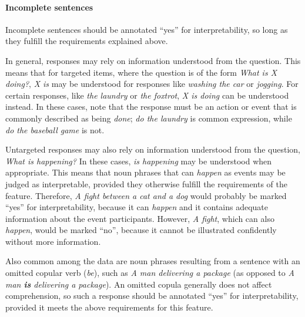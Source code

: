\documentclass[12pt,notitlepage]{article}
\begin{document}
\paragraph{Incomplete sentences} \label{para:interp-incomplete} Incomplete sentences should be annotated ``yes'' for interpretability, so long as they fulfill the requirements explained above.

In general, responses may rely on information understood from the question. This means that for targeted items, where the question is of the form \textit{What is X doing?}, \textit{X is} may be understood for responses like \textit{washing the car} or \textit{jogging}. For certain responses, like \textit{the laundry} or \textit{the foxtrot}, \textit{X is doing} can be understood instead. In these cases, note that the response must be an action or event that is commonly described as being \textit{done}; \textit{do the laundry} is common expression, while \textit{do the baseball game} is not. 

Untargeted responses may also rely on information understood from the question, \textit{What is happening?} In these cases, \textit{is happening} may be understood when appropriate. This means that noun phrases that can \textit{happen} as events may be judged as interpretable, provided they otherwise fulfill the requirements of the feature. Therefore, \textit{A fight between a cat and a dog} would probably be marked ``yes'' for interpretability, because it can \textit{happen} and it contains adequate information about the event participants. However, \textit{A fight}, which can also \textit{happen}, would be marked ``no'', because it cannot be illustrated confidently without more information.


Also common among the data are noun phrases resulting from a sentence with an omitted copular verb (\textit{be}), such as \textit{A man delivering a package} (as opposed to \textit{A man \textbf{is} delivering a package}). An omitted copula generally does not affect comprehension, so such a response should be annotated ``yes'' for interpretability, provided it meets the above requirements for this feature.
\end{document}
